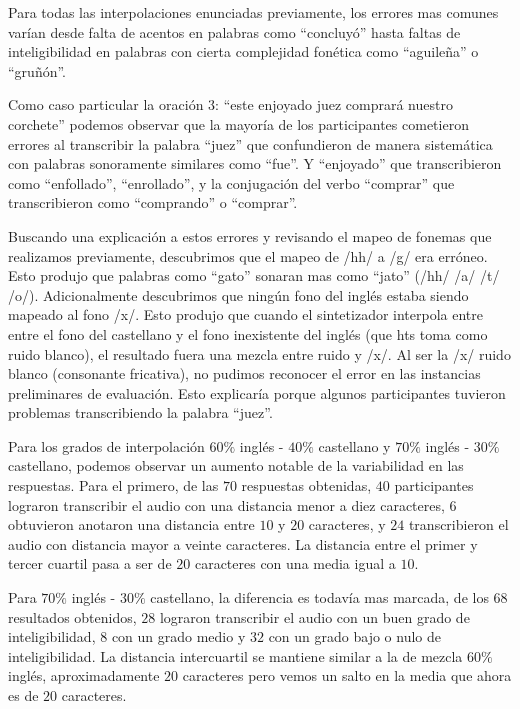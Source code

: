 Para todas las interpolaciones enunciadas previamente, los errores mas comunes varían desde falta de acentos en palabras como ``concluyó'' hasta faltas de inteligibilidad en palabras con cierta complejidad fonética como ``aguileña'' o ``gruñón''.

Como caso particular la oración $3$: ``este enjoyado juez comprará nuestro corchete'' podemos observar que la mayoría de los participantes cometieron errores al transcribir la palabra ``juez'' que confundieron de manera sistemática con palabras sonoramente similares como ``fue''. Y ``enjoyado'' que transcribieron como ``enfollado'', ``enrollado'', y la conjugación del verbo ``comprar'' que transcribieron como ``comprando'' o ``comprar''.

Buscando una explicación a estos errores y revisando el mapeo de fonemas que realizamos previamente, descubrimos que el mapeo de /hh/ a /g/ era erróneo. Esto produjo que palabras como ``gato'' sonaran mas como ``jato'' (/hh/ /a/ /t/ /o/). Adicionalmente descubrimos que ningún fono del inglés estaba siendo mapeado al fono /x/. Esto produjo que cuando el sintetizador interpola entre entre el fono del castellano y el fono inexistente del inglés (que hts toma como ruido blanco), el resultado fuera una mezcla entre ruido y /x/. Al ser la /x/ ruido blanco (consonante fricativa), no pudimos reconocer el error en las instancias preliminares de evaluación. Esto explicaría porque algunos participantes tuvieron problemas transcribiendo la palabra ``juez''.

Para los grados de interpolación $60\%$ inglés - $40\%$ castellano y $70\%$ inglés - $30\%$ castellano, podemos observar un aumento notable de la variabilidad en las respuestas. Para el primero, de las $70$ respuestas obtenidas, $40$ participantes lograron transcribir el audio con una distancia menor a diez caracteres, $6$ obtuvieron anotaron una distancia entre $10$ y $20$ caracteres, y $24$ transcribieron el audio con distancia mayor a veinte caracteres. La distancia entre el primer y tercer cuartil pasa a ser de $20$ caracteres con una media igual a $10$.

Para $70\%$ inglés - $30\%$ castellano, la diferencia es todavía mas marcada, de los $68$ resultados obtenidos, $28$ lograron transcribir el audio con un buen grado de inteligibilidad, $8$ con un grado medio y $32$ con un grado bajo o nulo de inteligibilidad. La distancia intercuartil se mantiene similar a la de mezcla $60\%$ inglés, aproximadamente $20$ caracteres pero vemos un salto en la media que ahora es de $20$ caracteres.

